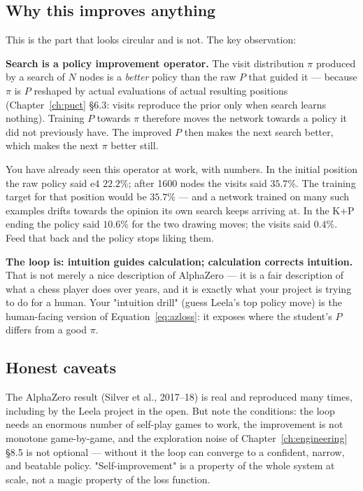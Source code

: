 \subsection{Why this improves anything}

This is the part that looks circular and is not. The key observation:

\begin{established}
\textbf{Search is a policy improvement operator.} The visit distribution $\pi$ produced by a
search of $N$ nodes is a \emph{better} policy than the raw $P$ that guided it --- because $\pi$
is $P$ reshaped by actual evaluations of actual resulting positions
(Chapter~\ref{ch:puct} §6.3: visits reproduce the prior only when search learns nothing).
Training $P$ towards $\pi$ therefore moves the network towards a policy it did not previously
have. The improved $P$ then makes the next search better, which makes the next $\pi$ better
still.
\end{established}

You have already seen this operator at work, with numbers. In the initial position the raw
policy said e4 $22.2\%$; after 1600 nodes the visits said $35.7\%$. The training target for
that position would be $35.7\%$ --- and a network trained on many such examples drifts towards
the opinion its own search keeps arriving at. In the K+P ending the policy said $10.6\%$ for
the two drawing moves; the visits said $0.4\%$. Feed that back and the policy stops liking
them.

\begin{keyidea}
\textbf{The loop is: intuition guides calculation; calculation corrects intuition.} That is
not merely a nice description of AlphaZero --- it is a fair description of what a chess player
does over years, and it is exactly what your project is trying to do for a human. Your
"intuition drill" (guess Leela's top policy move) is the human-facing version of
Equation~\eqref{eq:azloss}: it exposes where the student's $P$ differs from a good $\pi$.
\end{keyidea}

\subsection{Honest caveats}

\begin{researchfinding}
The AlphaZero result (Silver et al., 2017--18) is real and reproduced many times, including by
the Leela project in the open. But note the conditions: the loop needs an enormous number of
self-play games to work, the improvement is not monotone game-by-game, and the exploration
noise of Chapter~\ref{ch:engineering} §8.5 is not optional --- without it the loop can
converge to a confident, narrow, and beatable policy. "Self-improvement" is a property of the
whole system at scale, not a magic property of the loss function.
\end{researchfinding}

